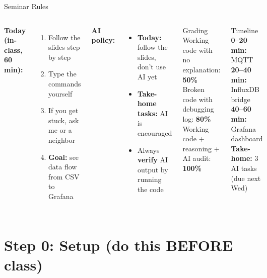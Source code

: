 \documentclass[aspectratio=169,11pt]{beamer}
\begin{document}
\begin{frame}{Seminar Rules}
    \begin{columns}
        \textbf{Today (in-class, 60 min):}
        \begin{enumerate}
            \item Follow the slides step by step
            \item Type the commands yourself
            \item If you get stuck, ask me or a neighbor
            \item \textbf{Goal:} see data flow from CSV to Grafana
        \end{enumerate}

        \vspace{0.3cm}
        \textbf{AI policy:}
        \begin{itemize}
            \item \textbf{Today:} follow the slides, don't use AI yet
            \item \textbf{Take-home tasks:} AI is encouraged
            \item Always \textbf{verify} AI output by running the code
        \end{itemize}

        \begin{exampleblock}{Grading}
            Working code with no explanation: \textbf{50\%}\\[4pt]
            Broken code with debugging log: \textbf{80\%}\\[4pt]
            Working code + reasoning + AI audit: \textbf{100\%}
        \end{exampleblock}

        \vspace{0.2cm}
        \begin{alertblock}{Timeline}
            \textbf{0--20 min:} MQTT\\
            \textbf{20--40 min:} InfluxDB bridge\\
            \textbf{40--60 min:} Grafana dashboard\\[4pt]
            \textbf{Take-home:} 3 AI tasks (due next Wed)
        \end{alertblock}
    \end{columns}
\end{frame}

\section{Step 0: Setup (do this BEFORE class)}
\end{document}
